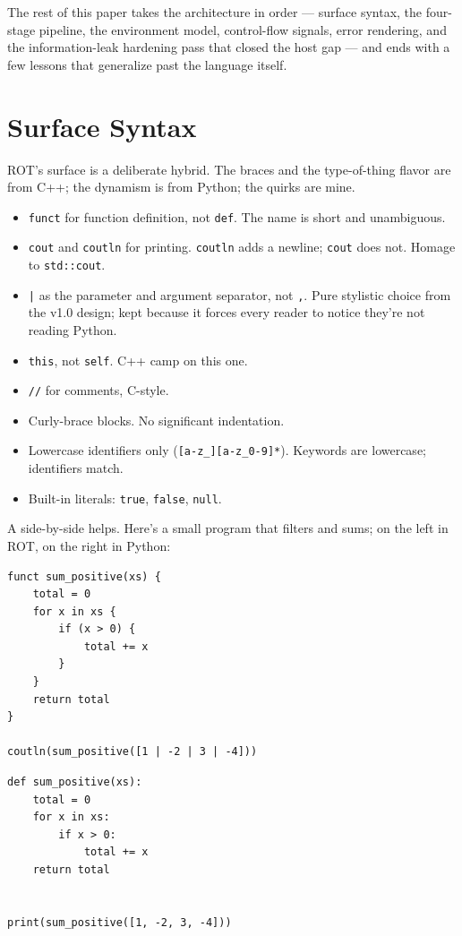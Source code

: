 \documentclass[11pt]{article}
\begin{document}
The rest of this paper takes the architecture in order --- surface syntax, the four-stage pipeline, the environment model, control-flow signals, error rendering, and the information-leak hardening pass that closed the host gap --- and ends with a few lessons that generalize past the language itself.

\section{Surface Syntax}

ROT's surface is a deliberate hybrid. The braces and the type-of-thing flavor are from C++; the dynamism is from Python; the quirks are mine.

\begin{itemize}[leftmargin=*,nosep,topsep=4pt,partopsep=0pt]
  \item \texttt{funct} for function definition, not \texttt{def}. The name is short and unambiguous.
  \item \texttt{cout} and \texttt{coutln} for printing. \texttt{coutln} adds a newline; \texttt{cout} does not. Homage to \texttt{std::cout}.
  \item \texttt{|} as the parameter and argument separator, not \texttt{,}. Pure stylistic choice from the v1.0 design; kept because it forces every reader to notice they're not reading Python.
  \item \texttt{this}, not \texttt{self}. C++ camp on this one.
  \item \texttt{//} for comments, C-style.
  \item Curly-brace blocks. No significant indentation.
  \item Lowercase identifiers only (\texttt{[a-z\_][a-z\_0-9]*}). Keywords are lowercase; identifiers match.
  \item Built-in literals: \texttt{true}, \texttt{false}, \texttt{null}.
\end{itemize}

A side-by-side helps. Here's a small program that filters and sums; on the left in ROT, on the right in Python:

\begin{minipage}[t]{0.50\textwidth}
\begin{lstlisting}[style=rotstyle]
funct sum_positive(xs) {
    total = 0
    for x in xs {
        if (x > 0) {
            total += x
        }
    }
    return total
}

coutln(sum_positive([1 | -2 | 3 | -4]))
\end{lstlisting}
\end{minipage}\hfill
\begin{minipage}[t]{0.45\textwidth}
\begin{lstlisting}[style=pystyle]
def sum_positive(xs):
    total = 0
    for x in xs:
        if x > 0:
            total += x
    return total


print(sum_positive([1, -2, 3, -4]))
\end{lstlisting}
\end{minipage}
\end{document}
